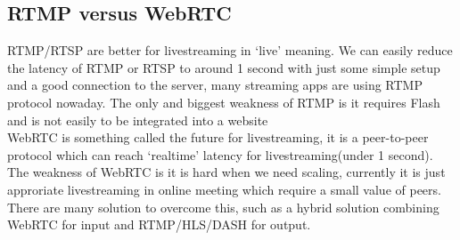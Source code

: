 \subsection{RTMP versus WebRTC}
RTMP/RTSP are better for livestreaming in ‘live’ meaning. We can easily reduce the latency of RTMP or RTSP to around 1 second with just some simple setup and a good connection to the server, many streaming apps are using RTMP protocol nowaday. The only and biggest weakness of RTMP is it requires Flash and is not easily to be integrated into a website\\

WebRTC is something called the future for livestreaming, it is a peer-to-peer protocol which can reach ‘realtime’ latency for livestreaming(under 1 second). The weakness of WebRTC is it is hard when we need scaling, currently it is just approriate livestreaming in online meeting which require a small value of peers. There are many solution to overcome this, such as a hybrid solution combining WebRTC for input and RTMP/HLS/DASH for output.

















